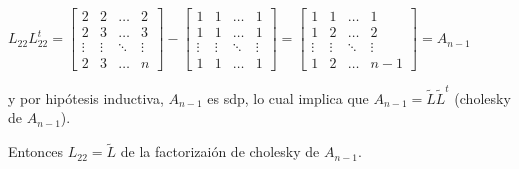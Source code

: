 \begin{itemize}
\begin{itemize}
        $L_{22}L_{22}^{t} = 
        \begin{bmatrix} 
            2 & 2 &\ldots & 2 \\
            2 & 3 &\ldots & 3 \\
            \vdots & \vdots & \ddots & \vdots \\
            2 & 3 & \ldots & n
        \end{bmatrix}
        -
        \begin{bmatrix} 
            1 & 1 &\ldots & 1 \\
            1 & 1 &\ldots & 1 \\
            \vdots & \vdots & \ddots & \vdots \\
            1 & 1 & \ldots & 1
        \end{bmatrix}
        =
        \begin{bmatrix} 
            1 & 1 &\ldots & 1 \\
            1 & 2 &\ldots & 2 \\
            \vdots & \vdots & \ddots & \vdots \\
            1 & 2 & \ldots & n-1
        \end{bmatrix}
        =
        A_{n-1}
        $
    \end{itemize}

    y por hipótesis inductiva, $A_{n-1}$ es sdp, lo cual implica que $A_{n-1} = \widetilde{L}\widetilde{L}^{t}$ (cholesky de $A_{n-1}$).

    Entonces $L_{22} = \widetilde{L}$ de la factorizaión de cholesky de $A_{n-1}$.

\end{itemize}
